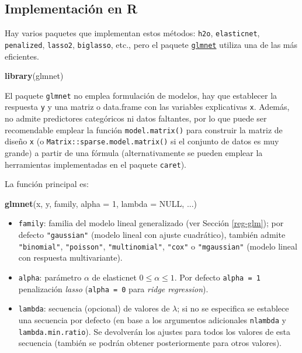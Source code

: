 \documentclass[
  spanish,
]{book}
\newenvironment{Shaded}{\begin{snugshade}}{\end{snugshade}}
\newcommand{\DataTypeTok}[1]{\textcolor[rgb]{0.13,0.29,0.53}{#1}}
\newcommand{\DecValTok}[1]{\textcolor[rgb]{0.00,0.00,0.81}{#1}}
\newcommand{\KeywordTok}[1]{\textcolor[rgb]{0.13,0.29,0.53}{\textbf{#1}}}
\newcommand{\NormalTok}[1]{#1}
\newcommand{\OtherTok}[1]{\textcolor[rgb]{0.56,0.35,0.01}{#1}}
\theoremstyle{break}
\theoremstyle{definition}
\theoremstyle{definition}
\theoremstyle{definition}
\theoremstyle{remark}
\begin{document}
\hypertarget{implementaciuxf3n-en-r}{%
\subsection{Implementación en R}\label{implementaciuxf3n-en-r}}

Hay varios paquetes que implementan estos métodos: \texttt{h2o}, \texttt{elasticnet}, \texttt{penalized}, \texttt{lasso2}, \texttt{biglasso}, etc., pero el paquete \href{https://glmnet.stanford.edu}{\texttt{glmnet}} utiliza una de las más eficientes.

\begin{Shaded}
\begin{Highlighting}[]
\KeywordTok{library}\NormalTok{(glmnet)}
\end{Highlighting}
\end{Shaded}

El paquete \texttt{glmnet} no emplea formulación de modelos, hay que establecer la respuesta
\texttt{y} y una matriz o data.frame con las variables explicativas \texttt{x}.
Además, no admite predictores categóricos ni datos faltantes, por lo que puede ser recomendable emplear la función \texttt{model.matrix()} para construir la matriz de diseño \texttt{x} (o \texttt{Matrix::sparse.model.matrix()} si el conjunto de datos es muy grande) a partir de una fórmula (alternativamente se pueden emplear la herramientas implementadas en el paquete \texttt{caret}).

La función principal es:

\begin{Shaded}
\begin{Highlighting}[]
\KeywordTok{glmnet}\NormalTok{(x, y, family, }\DataTypeTok{alpha =} \DecValTok{1}\NormalTok{, }\DataTypeTok{lambda =} \OtherTok{NULL}\NormalTok{, ...)}
\end{Highlighting}
\end{Shaded}

\begin{itemize}
\item
  \texttt{family}: familia del modelo lineal generalizado (ver Sección \ref{reg-glm}); por defecto \texttt{"gaussian"} (modelo lineal con ajuste cuadrático), también admite \texttt{"binomial"}, \texttt{"poisson"}, \texttt{"multinomial"}, \texttt{"cox"} o \texttt{"mgaussian"} (modelo lineal con respuesta multivariante).
\item
  \texttt{alpha}: parámetro \(\alpha\) de elasticnet \(0 \leq \alpha \leq 1\). Por defecto \texttt{alpha\ =\ 1} penalización \emph{lasso} (\texttt{alpha\ =\ 0} para \emph{ridge regression}).
\item
  \texttt{lambda}: secuencia (opcional) de valores de \(\lambda\); si no se especifica se establece una secuencia por defecto (en base a los argumentos adicionales \texttt{nlambda} y \texttt{lambda.min.ratio}). Se devolverán los ajustes para todos los valores de esta secuencia (también se podrán obtener posteriormente para otros valores).
\end{itemize}
\end{document}
